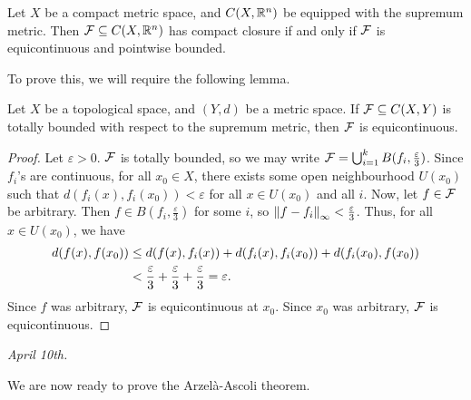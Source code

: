 \begin{theorem}
    Let $X$ be a compact metric space, and $C(X,\mathbb{R}^{n})$ be equipped with the supremum metric. Then $\mathcal{F} \subseteq C(X,\mathbb{R}^{n})$ has compact closure if and only if $\mathcal{F}$ is equicontinuous and pointwise bounded.
\end{theorem}

To prove this, we will require the following lemma.

\begin{lemma}
    Let $X$ be a topological space, and $(Y,d)$ be a metric space. If $\mathcal{F} \subseteq C(X,Y)$ is totally bounded with respect to the supremum metric, then $\mathcal{F}$ is equicontinuous.
\end{lemma}

\begin{proof}
    Let $\varepsilon > 0$. $\mathcal{F}$ is totally bounded, so we may write $\mathcal{F} = \bigcup_{i=1}^{k} B(f_{i},\frac{\varepsilon}{3})$. Since $f_{i}$'s are continuous, for all $x_{0} \in X$, there exists some open neighbourhood $U(x_{0})$ such that $d(f_{i}(x),f_{i}(x_{0})) < \varepsilon$ for all $x \in U(x_{0})$ and all $i$. 
Now, let $f \in \mathcal{F}$ be arbitrary. Then $f \in B(f_{i},\frac{\varepsilon}{3})$ for some $i$, so $\left\lVert f - f_{i}\right\rVert_{\infty} < \frac{\varepsilon}{3}$. Thus, for all $x \in U(x_{0})$, we have
    \begin{align}
        d(f(x),f(x_{0})) &\leq d(f(x),f_{i}(x)) + d(f_{i}(x),f_{i}(x_{0})) + d(f_{i}(x_{0}),f(x_{0})) \notag\\
        &< \frac{\varepsilon}{3} + \frac{\varepsilon}{3} + \frac{\varepsilon}{3} = \varepsilon.
    \end{align}
    Since $f$ was arbitrary, $\mathcal{F}$ is equicontinuous at $x_{0}$. Since $x_{0}$ was arbitrary, $\mathcal{F}$ is equicontinuous.
\end{proof}

\noindent \textit{April 10th.}

We are now ready to prove the Arzelà-Ascoli theorem.

